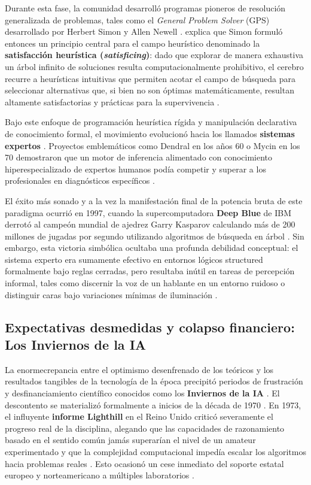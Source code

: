\documentclass[12pt, a4paper]{article}
\begin{document}
Durante esta fase, la comunidad desarrolló programas pioneros de resolución generalizada de problemas, tales como el \textit{General Problem Solver} (GPS) desarrollado por Herbert Simon y Allen Newell \parencite{haenlein2019brief, buchanan2005very}. \textcite{buchanan2005very} explica que Simon formuló entonces un principio central para el campo heurístico denominado la \textbf{satisfacción heurística (\textit{satisficing})}: dado que explorar de manera exhaustiva un árbol infinito de soluciones resulta computacionalmente prohibitivo, el cerebro recurre a heurísticas intuitivas que permiten acotar el campo de búsqueda para seleccionar alternativas que, si bien no son óptimas matemáticamente, resultan altamente satisfactorias y prácticas para la supervivencia \parencite{buchanan2005very}. 

Bajo este enfoque de programación heurística rígida y manipulación declarativa de conocimiento formal, el movimiento evolucionó hacia los llamados \textbf{sistemas expertos} \parencite{haenlein2019brief, buchanan2005very}. Proyectos emblemáticos como Dendral en los años 60 o Mycin en los 70 demostraron que un motor de inferencia alimentado con conocimiento hiperespecializado de expertos humanos podía competir y superar a los profesionales en diagnósticos específicos \parencite{buchanan2005very}. 

El éxito más sonado y a la vez la manifestación final de la potencia bruta de este paradigma ocurrió en 1997, cuando la supercomputadora \textbf{Deep Blue} de IBM derrotó al campeón mundial de ajedrez Garry Kasparov calculando más de 200 millones de jugadas por segundo utilizando algoritmos de búsqueda en árbol \parencite{haenlein2019brief, buchanan2005very}. Sin embargo, esta victoria simbólica ocultaba una profunda debilidad conceptual: el sistema experto era sumamente efectivo en entornos lógicos structured formalmente bajo reglas cerradas, pero resultaba inútil en tareas de percepción informal, tales como discernir la voz de un hablante en un entorno ruidoso o distinguir caras bajo variaciones mínimas de iluminación \parencite{haenlein2019brief}.

\subsection{Expectativas desmedidas y colapso financiero: Los Inviernos de la IA}

La enormecrepancia entre el optimismo desenfrenado de los teóricos y los resultados tangibles de la tecnología de la época precipitó periodos de frustración y desfinanciamiento científico conocidos como los \textbf{Inviernos de la IA} \parencite{haenlein2019brief}. El descontento se materializó formalmente a inicios de la década de 1970 \parencite{haenlein2019brief}. En 1973, el influyente \textbf{informe Lighthill} en el Reino Unido criticó severamente el progreso real de la disciplina, alegando que las capacidades de razonamiento basado en el sentido común jamás superarían el nivel de un amateur experimentado y que la complejidad computacional impedía escalar los algoritmos hacia problemas reales \parencite{haenlein2019brief}. Esto ocasionó un cese inmediato del soporte estatal europeo y norteamericano a múltiples laboratorios \parencite{haenlein2019brief}.
\end{document}
